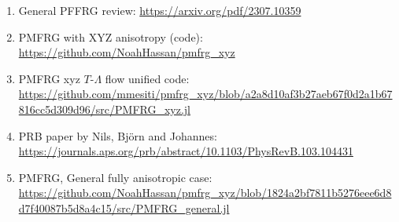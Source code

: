 \documentclass{article}
\begin{document}
\begin{enumerate}
\item General PFFRG review: \href{https://arxiv.org/pdf/2307.10359}{https://arxiv.org/pdf/2307.10359} \label{PFFRGReview}

\item PMFRG with XYZ anisotropy (code): \href{https://github.com/NoahHassan/pmfrg\_xyz}{https://github.com/NoahHassan/pmfrg\_xyz}
\item PMFRG xyz $T$-$\Lambda$ flow unified code: \href{https://github.com/mmesiti/pmfrg\_xyz/blob/a2a8d10af3b27aeb67f0d2a1b67816cc5d309d96/src/PMFRG\_xyz.jl} {https://github.com/mmesiti/pmfrg\_xyz/blob/a2a8d10af3b27aeb67f0d2a1b67816cc5d309d96/src/PMFRG\_xyz.jl} \label{PMFRGXYZTLambda}
\item PRB paper by Nils, Björn and Johannes: \href{https://journals.aps.org/prb/abstract/10.1103/PhysRevB.103.104431}{https://journals.aps.org/prb/abstract/10.1103/PhysRevB.103.104431} \label{PRB103}
\item PMFRG, General fully anisotropic case:
  \href{https://github.com/NoahHassan/pmfrg\_xyz/blob/1824a2bf7811b5276eee6d8d7f40087b5d8a4c15/src/PMFRG\_general.jl}{https://github.com/NoahHassan/pmfrg\_xyz/blob/1824a2bf7811b5276eee6d8d7f40087b5d8a4c15/src/PMFRG\_general.jl} \label{PMFRGFullAniso}
\end{enumerate}
\end{document}
